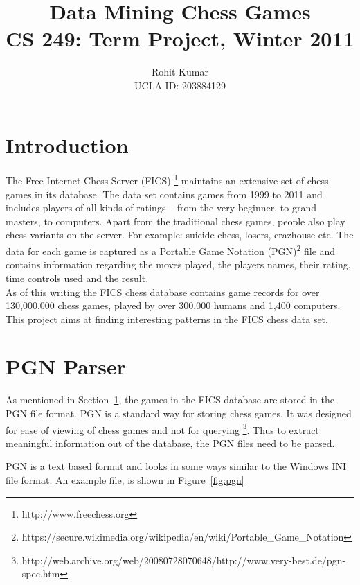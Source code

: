 \documentclass{article}
\author{Rohit Kumar \\UCLA ID: 203884129}
\title{Data Mining Chess Games \\ CS 249: Term Project, Winter 2011}
\begin{document}
\maketitle

\section{Introduction}
\label{sec:Introduction}
The Free Internet Chess Server (FICS) \footnote{http://www.freechess.org} maintains an extensive set of chess games in its database. The data set contains games from 1999 to 2011 and includes players of all kinds of ratings -- from the very beginner, to grand masters, to computers. Apart from the traditional chess games, people also play chess variants on the server. For example: suicide chess, losers, crazhouse etc. The data for each game is captured as a Portable Game Notation (PGN)\footnote{https://secure.wikimedia.org/wikipedia/en/wiki/Portable\_Game\_Notation} file and contains information regarding the moves played, the players names, their rating, time controls used and the result. \\

As of this writing the FICS chess database contains game records for over 130,000,000 chess games, played by over 300,000 humans and 1,400 computers. This project aims at finding interesting patterns in the FICS chess data set.

\section{PGN Parser}

As mentioned in Section~\ref{sec:Introduction}, the games in the FICS
database are stored in the PGN file format. PGN is a standard way for
storing chess games. It was designed for ease of viewing of chess
games and not for querying 
\footnote{http://web.archive.org/web/20080728070648/http://www.very-best.de/pgn-spec.htm}. Thus to extract meaningful information out of the database, the PGN files need to be parsed.

PGN is a text based format and looks in some ways similar to the Windows INI file format. An example file, is shown in Figure~\ref{fig:pgn}
\end{document}
